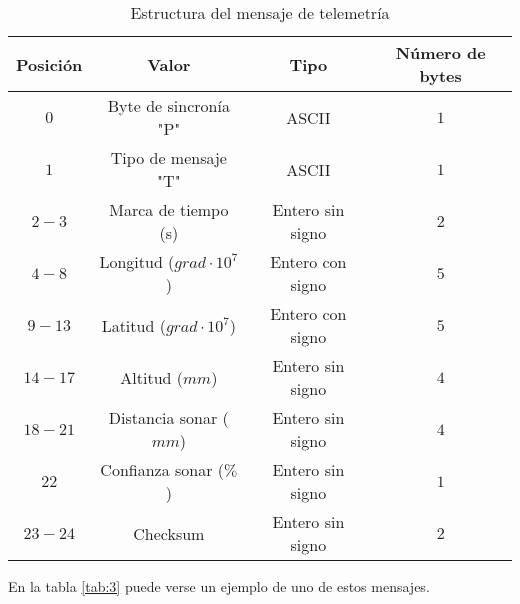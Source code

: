 \begin{table}[h]
	\centering
	\caption{Estructura del mensaje de telemetría}
	\begin{tabular}{|c|c|c|c|}\hline 
		\textbf{Posición}	& \textbf{Valor} & \textbf{Tipo} &\textbf{Número de bytes} \\ \hline \hline 
		$0$		& Byte de sincronía "P"				& ASCII	 			&	$1$ \\  \hline
		$1$		& Tipo de mensaje "T"				& ASCII	 			&	$1$ \\  \hline
		$2-3$	& Marca de tiempo (s)				& Entero sin signo	&   $2$ \\  \hline
		$4-8$	& Longitud ($grad \cdot 10^{7}$)	& Entero con signo	&   $5$ \\  \hline
		$9-13$	& Latitud ($grad \cdot 10^{7}$)		& Entero con signo	&  	$5$ \\  \hline
		$14-17$	& Altitud ($mm$)					& Entero sin signo	&   $4$ \\  \hline
		$18-21$	& Distancia sonar ($mm$)			& Entero sin signo	&   $4$ \\  \hline
		$22$	& Confianza sonar ($\%$)			& Entero sin signo	&   $1$ \\  \hline
		$23-24$	& Checksum 							& Entero sin signo	&   $2$ \\  \hline
	\end{tabular}
	\label{tab:2}
\end{table}

En la tabla \ref{tab:3} puede verse un ejemplo de uno de estos mensajes.

